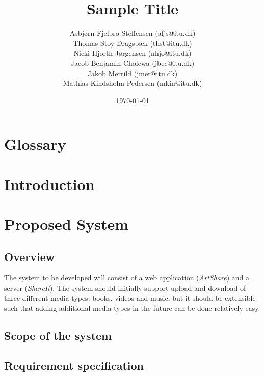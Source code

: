 \documentclass{report}
\title{Sample Title}
\date{\today}
\author{Asbj\o rn Fjelbro Steffensen (afjs@itu.dk)\\ Thomas Stoy Dragsb\ae k (thst@itu.dk)\\ Nicki Hjorth J\o rgensen (nhjo@itu.dk)\\ Jacob Benjamin Cholewa (jbec@itu.dk)\\ Jakob Merrild (jmer@itu.dk)\\ Mathias Kindsholm Pedersen (mkin@itu.dk)}
\begin{document}

\listoftodos[TODO]

\newpage
\tableofcontents

\chapter{Glossary}


\chapter{Introduction}


\newpage


\chapter{Proposed System}

\section{Overview}
The system to be developed will consist of a web application (\textit{ArtShare}) and a server (\textit{ShareIt}). The system should initially support upload and download of three different media types: books, videos and music, but it should be extensible such that adding additional media types in the future can be done relatively easy.


\section{Scope of the system}


\section{Requirement specification}
\end{document}
